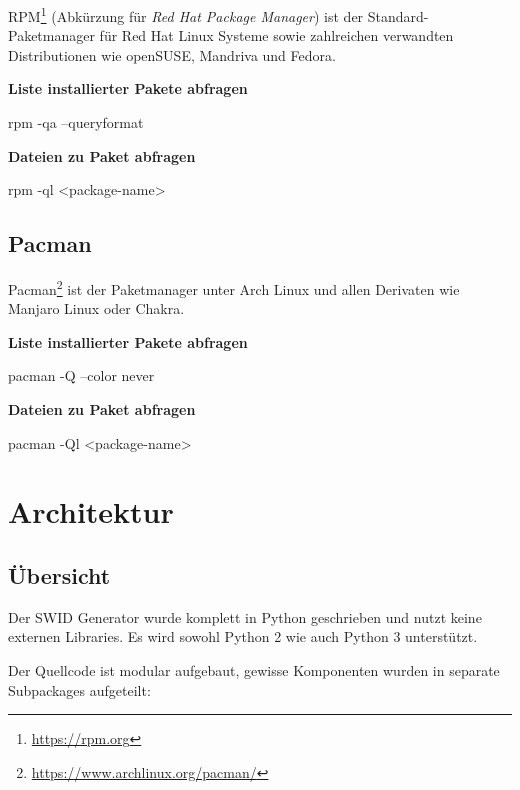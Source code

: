 RPM\footnote{\url{https://rpm.org}} (Abkürzung für \textit{Red Hat Package
Manager}) ist der Standard-Paketmanager für Red Hat Linux Systeme sowie
zahlreichen verwandten Distributionen wie openSUSE, Mandriva und Fedora.

\textbf{Liste installierter Pakete abfragen}

\begin{bashcode}
rpm -qa --queryformat %
\end{bashcode}

\textbf{Dateien zu Paket abfragen}

\begin{bashcode}
rpm -ql <package-name>
\end{bashcode}


\subsection{Pacman}

Pacman\footnote{\url{https://www.archlinux.org/pacman/}} ist der Paketmanager
unter Arch Linux und allen Derivaten wie Manjaro Linux oder Chakra.

\textbf{Liste installierter Pakete abfragen}

\begin{bashcode}
pacman -Q --color never
\end{bashcode}

\textbf{Dateien zu Paket abfragen}

\begin{bashcode}
pacman -Ql <package-name>
\end{bashcode}



\section{Architektur}

\subsection{Übersicht}

Der SWID Generator wurde komplett in Python geschrieben und nutzt keine externen
Libraries. Es wird sowohl Python 2 wie auch Python 3 unterstützt.

Der Quellcode ist modular aufgebaut, gewisse Komponenten wurden in separate
Subpackages aufgeteilt:

